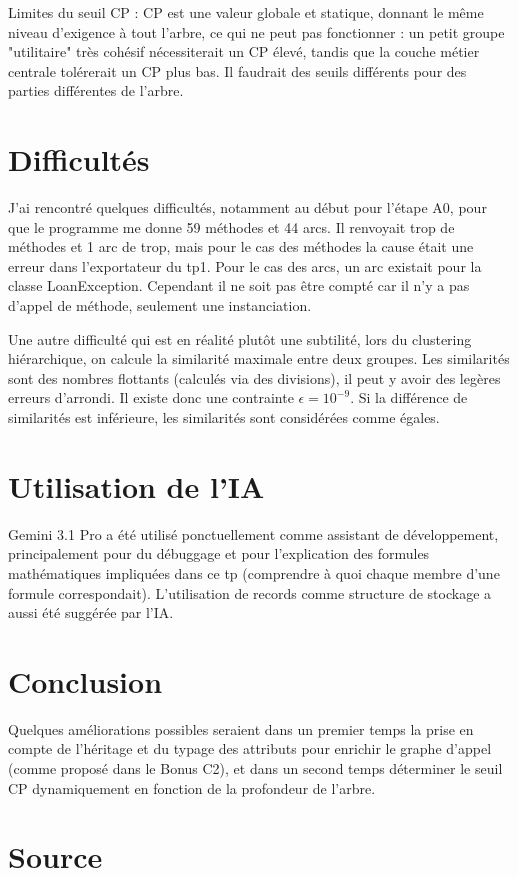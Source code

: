 \documentclass{Templates/customArticle}
\begin{document}
Limites du seuil CP : CP est une valeur globale et statique, donnant le même niveau d'exigence à tout l'arbre, ce qui ne peut pas fonctionner : un petit groupe "utilitaire" très cohésif nécessiterait un CP élevé, tandis que la couche métier centrale tolérerait un CP plus bas. Il faudrait des seuils différents pour des parties différentes de l'arbre.
\newpage
\section{Difficultés}

J'ai rencontré quelques difficultés, notamment au début pour l'étape A0, pour que le programme me donne 59 méthodes et 44 arcs. Il renvoyait trop de méthodes et 1 arc de trop, mais pour le cas des méthodes la cause était une erreur dans l'exportateur du tp1. Pour le cas des arcs, un arc existait pour la classe LoanException. Cependant il ne soit pas être compté car il n'y a pas d'appel de méthode, seulement une instanciation.

Une autre difficulté qui est en réalité plutôt une subtilité, lors du clustering hiérarchique, on calcule la similarité maximale entre deux groupes. Les similarités sont des nombres flottants (calculés via des divisions), il peut y avoir des legères erreurs d'arrondi. Il existe donc une contrainte $\epsilon = 10^{-9}$. Si la différence de similarités est inférieure, les similarités sont considérées comme égales.

\section{Utilisation de l'IA}

Gemini 3.1 Pro a été utilisé ponctuellement comme assistant de développement, principalement pour du débuggage et pour l'explication des formules mathématiques impliquées dans ce tp (comprendre à quoi chaque membre d'une formule correspondait). L'utilisation de records comme structure de stockage a aussi été suggérée par l'IA. 

\section{Conclusion}

Quelques améliorations possibles seraient dans un premier temps la prise en compte de l'héritage et du typage des attributs pour enrichir le graphe d'appel (comme proposé dans le Bonus C2), et dans un second temps déterminer le seuil CP dynamiquement en fonction de la profondeur de l'arbre.

\section{Source}


\end{document}
